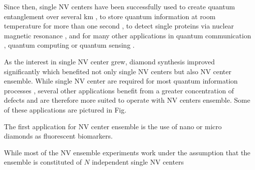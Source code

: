\documentclass[a4paper,11pt]{report}
\begin{document}
Since then, single NV centers have been successfully used to create quantum entanglement over several km \citep{hensen2015loophole}, to store quantum information at room temperature for more than one second \citep{maurer2012room}, to detect single proteins via nuclear magnetic resonance \citep{lovchinsky2016nuclear}, and for many other applications in quantum communication \citep{wehner2018quantum}, quantum computing \citep{de2021materials} or quantum sensing \citep{degen2017quantum}.

As the interest in single NV center grew, diamond synthesis improved significantly \citep{achard2020chemical, barry2020sensitivity, edmonds2020generation}  which benefited not only single NV centers but also NV center ensemble. While single NV center are required for most quantum information processes \citep{ladd2010quantum}, several other applications benefit from a greater concentration of defects and are therefore more suited to operate with NV centers ensemble. Some of these applications are pictured in Fig.

The first application for NV center ensemble is the use of nano or micro diamonds as fluorescent biomarkers. 
   
While most of the NV ensemble experiments work under the assumption that the ensemble is constituted of $N$ independent single NV centers 



\printbibliography
\end{document}
